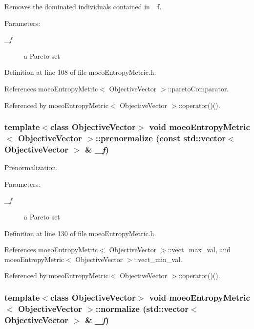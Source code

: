Removes the dominated individuals contained in \_\-f. 

\begin{Desc}
\item[Parameters:]
\begin{description}
\item[{\em \_\-f}]a Pareto set \end{description}
\end{Desc}


Definition at line 108 of file moeo\-Entropy\-Metric.h.

References moeo\-Entropy\-Metric$<$ Objective\-Vector $>$::pareto\-Comparator.

Referenced by moeo\-Entropy\-Metric$<$ Objective\-Vector $>$::operator()().
\subsubsection{\setlength{\rightskip}{0pt plus 5cm}template$<$class Objective\-Vector$>$ void \bf{moeo\-Entropy\-Metric}$<$ Objective\-Vector $>$::prenormalize (const std::vector$<$ Objective\-Vector $>$ \& {\em \_\-f})\hspace{0.3cm}{\tt  [inline, private]}}\label{classmoeoEntropyMetric_51dd04bdd0ac6315f4f5956fb726cec1}


Prenormalization. 

\begin{Desc}
\item[Parameters:]
\begin{description}
\item[{\em \_\-f}]a Pareto set \end{description}
\end{Desc}


Definition at line 130 of file moeo\-Entropy\-Metric.h.

References moeo\-Entropy\-Metric$<$ Objective\-Vector $>$::vect\_\-max\_\-val, and moeo\-Entropy\-Metric$<$ Objective\-Vector $>$::vect\_\-min\_\-val.

Referenced by moeo\-Entropy\-Metric$<$ Objective\-Vector $>$::operator()().
\subsubsection{\setlength{\rightskip}{0pt plus 5cm}template$<$class Objective\-Vector$>$ void \bf{moeo\-Entropy\-Metric}$<$ Objective\-Vector $>$::normalize (std::vector$<$ Objective\-Vector $>$ \& {\em \_\-f})\hspace{0.3cm}{\tt  [inline, private]}}\label{classmoeoEntropyMetric_2ed5771c3c611634b415f4be48cad172}


